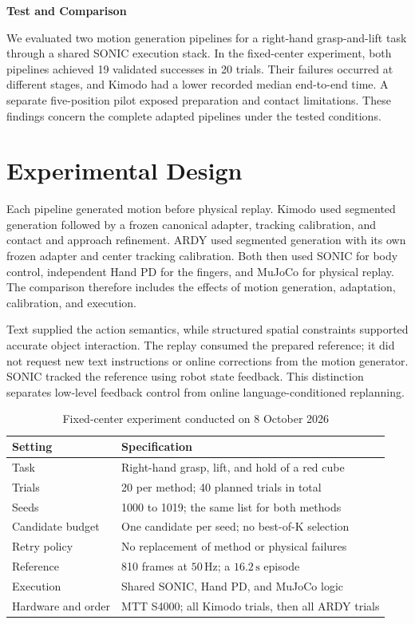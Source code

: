 \documentclass[11pt,a4paper]{article}
\begin{document}
{\large\bfseries Test and Comparison\par}
\vspace{3pt}


We evaluated two motion generation pipelines for a right-hand grasp-and-lift task through a shared SONIC execution stack. In the fixed-center experiment, both pipelines achieved 19 validated successes in 20 trials. Their failures occurred at different stages, and Kimodo had a lower recorded median end-to-end time. A separate five-position pilot exposed preparation and contact limitations. These findings concern the complete adapted pipelines under the tested conditions.

\section*{Experimental Design}

Each pipeline generated motion before physical replay. Kimodo used segmented generation followed by a frozen canonical adapter, tracking calibration, and contact and approach refinement. ARDY used segmented generation with its own frozen adapter and center tracking calibration. Both then used SONIC for body control, independent Hand PD for the fingers, and MuJoCo for physical replay. The comparison therefore includes the effects of motion generation, adaptation, calibration, and execution.

Text supplied the action semantics, while structured spatial constraints supported accurate object interaction. The replay consumed the prepared reference; it did not request new text instructions or online corrections from the motion generator. SONIC tracked the reference using robot state feedback. This distinction separates low-level feedback control from online language-conditioned replanning.

\begin{table}[H]
\centering
\caption{Fixed-center experiment conducted on 8 October 2026}
\label{tab:comparison-1}
\small
\begin{tabularx}{\linewidth}{|L{\tabcolsep\relax}|Y|}
\hline
{}
\textbf{Setting} & \textbf{Specification} \\ \hline
Task & Right-hand grasp, lift, and hold of a red cube \\ \hline
Trials & 20 per method; 40 planned trials in total \\ \hline
Seeds & 1000 to 1019; the same list for both methods \\ \hline
Candidate budget & One candidate per seed; no best-of-K selection \\ \hline
Retry policy & No replacement of method or physical failures \\ \hline
Reference & 810 frames at \(50\,\mathrm{Hz}\); a \(16.2\,\mathrm{s}\) episode \\ \hline
Execution & Shared SONIC, Hand PD, and MuJoCo logic \\ \hline
Hardware and order & MTT S4000; all Kimodo trials, then all ARDY trials \\ \hline
\end{tabularx}
\end{table}
\end{document}
